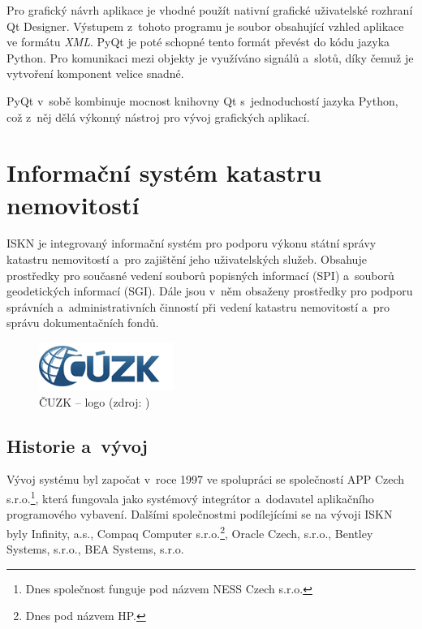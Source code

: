 \documentclass[a4paper,12pt,oneside]{book}
\begin{document}
Pro grafický návrh aplikace je vhodné použít nativní grafické
uživatelské rozhraní Qt Designer. Výstupem z~tohoto programu je soubor
obsahující vzhled aplikace ve formátu \textit{XML}. PyQt je poté
schopné tento formát převést do kódu jazyka Python. Pro komunikaci
mezi objekty je využíváno signálů a~slotů, díky čemuž je vytvoření
komponent velice snadné.

PyQt v~sobě kombinuje mocnost knihovny Qt s~jednoduchostí jazyka
Python, což z~něj dělá výkonný nástroj pro vývoj grafických aplikací.
\cite{pyqt} \cite{pyqt_wiki}


\clearpage
\chapter{Informační systém katastru nemovitostí}
\label{l_iskn}

ISKN je integrovaný informační systém pro podporu výkonu státní správy
katastru nemovitostí a~pro zajištění jeho uživatelských
služeb. Obsahuje prostředky pro současné vedení souborů popisných
informací (SPI) a~souborů geodetických informací (SGI). Dále jsou
v~něm obsaženy prostředky pro podporu správních a~administrativních
činností při vedení katastru nemovitostí a~pro správu dokumentačních
fondů. \cite{iskn}

\begin{figure}[htb]
\centering
\includegraphics[scale=1]{images/cuzk-logo.png}
\caption[ČUZK -- logo]{ČUZK -- logo (zdroj: \cite{iskn})}
\end{figure}

\section{Historie a~vývoj}

Vývoj systému byl započat v~roce 1997 ve spolupráci se společností APP
Czech s.r.o.\footnote{Dnes společnost funguje pod názvem NESS Czech
  s.r.o.}, která fungovala jako systémový integrátor a~dodavatel
aplikačního programového vybavení. Dalšími společnostmi podílejícími
se na vývoji ISKN byly Infinity, a.s., Compaq Computer
s.r.o.\footnote{Dnes pod názvem HP.}, Oracle Czech, s.r.o., Bentley
Systems, s.r.o., BEA Systems, s.r.o. \cite{iskn}
\end{document}
